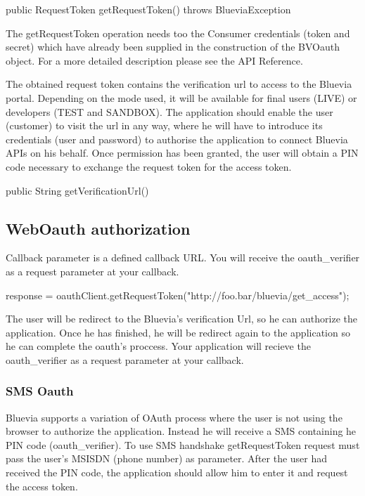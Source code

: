 \begin{DoxyCode}
public RequestToken getRequestToken() throws BlueviaException
\end{DoxyCode}


The getRequestToken operation needs too the Consumer credentials (token and secret) which have already been supplied in the construction of the BVOauth object. For a more detailed description please see the API Reference.

The obtained request token contains the verification url to access to the Bluevia portal. Depending on the mode used, it will be available for final users (LIVE) or developers (TEST and SANDBOX). The application should enable the user (customer) to visit the url in any way, where he will have to introduce its credentials (user and password) to authorise the application to connect Bluevia APIs on his behalf. Once permission has been granted, the user will obtain a PIN code necessary to exchange the request token for the access token.


\begin{DoxyCode}
public String getVerificationUrl()
\end{DoxyCode}
\hypertarget{blv_oauth_guide_web_oauth}{}\subsection{WebOauth authorization}\label{blv_oauth_guide_web_oauth}
Callback parameter is a defined callback URL. You will receive the oauth\_\-verifier as a request parameter at your callback.


\begin{DoxyCode}
response = oauthClient.getRequestToken("http://foo.bar/bluevia/get_access");
\end{DoxyCode}


The user will be redirect to the Bluevia's verification Url, so he can authorize the application. Once he has finished, he will be redirect again to the application so he can complete the oauth's proccess. Your application will recieve the oauth\_\-verifier as a request parameter at your callback.\hypertarget{blv_oauth_guide_retrieving_request_token_sec_sms}{}\subsubsection{SMS Oauth}\label{blv_oauth_guide_retrieving_request_token_sec_sms}
Bluevia supports a variation of OAuth process where the user is not using the browser to authorize the application. Instead he will receive a SMS containing he PIN code (oauth\_\-verifier). To use SMS handshake getRequestToken request must pass the user's MSISDN (phone number) as parameter. After the user had received the PIN code, the application should allow him to enter it and request the access token.


